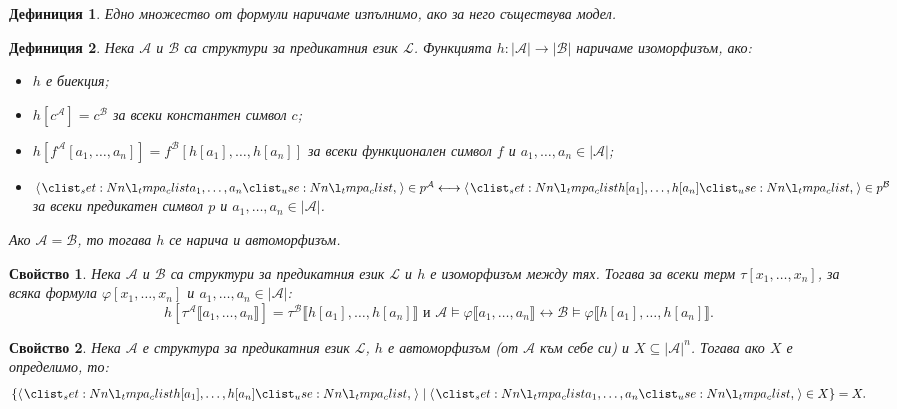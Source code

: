 \documentclass[12pt]{article}
\newcommand{\calA}{\mathcal{A}}
\newcommand{\calL}{\mathcal{L}}
\newcommand{\calB}{\mathcal{B}}
\newcommand{\db}[1]{\llbracket #1 \rrbracket}
\newtheorem*{definition}{Дефиниция}
\newtheorem*{property}{Свойство}
\theoremstyle{definition}
\begin{document}
\begin{definition}
    Едно множество от формули наричаме изпълнимо, ако за него съществува модел.
\end{definition}

\begin{definition}
    Нека $\calA$ и $\calB$ са структури за предикатния език $\calL$.
    Функцията $h : |\calA| \rightarrow |\calB|$ наричаме изоморфизъм, ако:
    \begin{itemize}
        \item $h$ е биекция;
        \item $h[c^\calA] = c^\calB$ за всеки константен символ $c$;
        \item $h[f^\calA[a_1, \dots, a_n]] = f^\calB[h[a_1], \dots, h[a_n]]$ за всеки функционален символ $f$ и $a_1, \dots, a_n \in |\calA|$;
        \item $\opair{a_1, \dots, a_n} \in p^\calA \longleftrightarrow \opair{h[a_1], \dots, h[a_n]} \in p^\calB$ за всеки предикатен символ $p$ и $a_1, \dots, a_n \in |\calA|$.
    \end{itemize}
    Ако $\calA = \calB$, то тогава $h$ се нарича и автоморфизъм.
\end{definition}

\begin{property}
    Нека $\calA$ и $\calB$ са структури за предикатния език $\calL$ и $h$ е изоморфизъм между тях.
    Тогава за всеки терм $\tau[x_1, \dots, x_n]$, за всяка формула $\varphi[x_1, \dots, x_n]$ и $a_1, \dots, a_n \in |\calA|$:
    \[
        h[\tau^\calA\db{a_1, \dots, a_n}] = \tau^\calB\db{h[a_1], \dots, h[a_n]} \text{ и } \calA \models \varphi \db{a_1, \dots, a_n} \longleftrightarrow \calB \models \varphi \db{h[a_1], \dots, h[a_n]}.
    \]
\end{property}

\begin{property}
    Нека $\calA$ е структура за предикатния език $\calL$, $h$ е автоморфизъм (от $\calA$ към себе си) и $X \subseteq |\calA|^n$.
    Тогава ако $X$ е определимо, то:
    \[
        \{ \opair{h[a_1], \dots, h[a_n]} \mid \opair{a_1, \dots, a_n} \in X \} = X.
    \]
\end{property}
\end{document}
